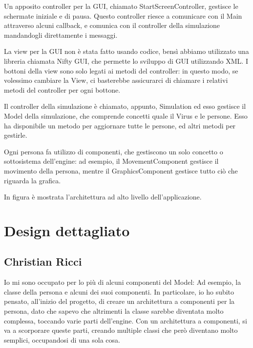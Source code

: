 \documentclass[a4paper,12pt]{report}
\begin{document}
Un apposito controller per la GUI, chiamato StartScreenController, gestisce le schermate iniziale e di pausa. Questo controller riesce a comunicare con il Main attraverso alcuni callback, e comunica con il controller della simulazione mandandogli direttamente i messaggi.

La view per la GUI non è stata fatto usando codice, bensì abbiamo utilizzato una libreria chiamata Nifty GUI, che permette lo sviluppo di GUI utilizzando XML. I bottoni della view sono solo legati ai metodi del controller: in questo modo, se volessimo cambiare la View, ci basterebbe assicurarci di chiamare i relativi metodi del controller per ogni bottone.

Il controller della simulazione è chiamato, appunto, Simulation ed esso gestisce il Model della simulazione, che comprende concetti quale il Virus e le persone. Esso ha disponibile un metodo per aggiornare tutte le persone, ed altri metodi per gestirle.

Ogni persona fa utilizzo di componenti, che gestiscono un solo concetto o sottosistema dell'engine: ad esempio, il MovementComponent gestisce il movimento della persona, mentre il GraphicsComponent gestisce tutto ciò che riguarda la grafica.

In figura è mostrata l'architettura ad alto livello dell'applicazione.


\section{Design dettagliato}

\subsection{Christian Ricci}

Io mi sono occupato per lo più di alcuni componenti del Model: Ad esempio, la classe della persona e alcuni dei suoi componenti. In particolare, io ho subito pensato, all'inizio del progetto, di creare un architettura a componenti per la persona, dato che sapevo che altrimenti la classe sarebbe diventata molto complessa, toccando varie parti dell'engine. Con un architettura a componenti, si va a scorporare queste parti, creando multiple classi che però diventano molto semplici, occupandosi di una sola cosa.
\end{document}
